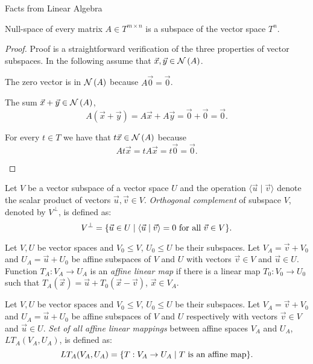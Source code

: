 \begin{chapter}{Facts from Linear Algebra}
\begin{remark}
Null-space of every matrix $A \in T ^ {m \times n}$ is a subspace of the vector space $T^{n}$.
\end{remark}
\begin{proof}
Proof is a straightforward verification of the three properties of vector subspaces. In the following assume that $\vec{x}, \vec{y} \in \mathcal{N}\left({A}\right)$.

\begin{description}
\item The zero vector is in $\mathcal{N}\left({A}\right)$ because $A\vec{0} = \vec{0}$.
\item The sum $\vec{x} + \vec{y} \in \mathcal{N}\left({A}\right)$,
\[
	A(\vec{x} + \vec{y}) = A\vec{x} + A\vec{y} = \vec{0} + \vec{0} = \vec{0} \text{.}
\]

\item For every $t \in T$ we have that $t \vec{x} \in \mathcal{N}\left({A}\right)$ because
\[
	At\vec{x} = tA\vec{x} = t\vec{0} = \vec{0} \text{.}
\]
\end{description}
\end{proof}

\begin{definition}
Let $V$ be a vector subspace of a vector space $U$ and the operation $\langle \vec{u} \mid \vec{v} \rangle$ denote the scalar product of vectors $\vec{u}, \vec{v} \in V$. \emph{Orthogonal complement} of subspace $V$, denoted by $V ^ {\bot}$, is defined as:
\[
	V ^ {\bot} = \{ \vec{u} \in U \mid \langle \vec{u} \mid \vec{v} \rangle = 0 \text{ for all } \vec{v} \in V \} \text{.}
\]
\end{definition}

\begin{definition}
\label{definition-affine-linear-map}
Let $V, U$ be vector spaces and $V_0 \leq V$, $U_0 \leq U$ be their subspaces. Let $V_A = \vec{v} + V_0$ and $U_A = \vec{u} + U_0$ be affine subspaces of $V$ and $U$ with vectors $\vec{v} \in V$ and $\vec{u} \in U$. Function $T_A: V_A \rightarrow U_A$ is an \emph{affine linear map} if there is a linear map $T_0: V_0 \rightarrow U_0$ such that $T_A(\vec{x}) = \vec{u} + T_0(\vec{x} - \vec{v})$, $\vec{x} \in V_A$.
\end{definition}

\begin{definition}
Let $V, U$ be vector spaces and $V_0 \leq V$, $U_0 \leq U$ be their subspaces. Let $V_A = \vec{v} + V_0$ and $U_A = \vec{u} + U_0$ be affine subspaces of $V$ and $U$ respectively with vectors $\vec{v} \in V$ and $\vec{u} \in U$. \emph{Set of all affine linear mappings} between affine spaces $V_A$ and $U_A$, $LT_A(V_A, U_A)$, is defined as:
\[
	LT_A(V_A, U_A) = \{ T: V_A \rightarrow U_A \mid T \text{ is an affine map} \} \text{.}
\]
\end{definition}


\end{chapter}
